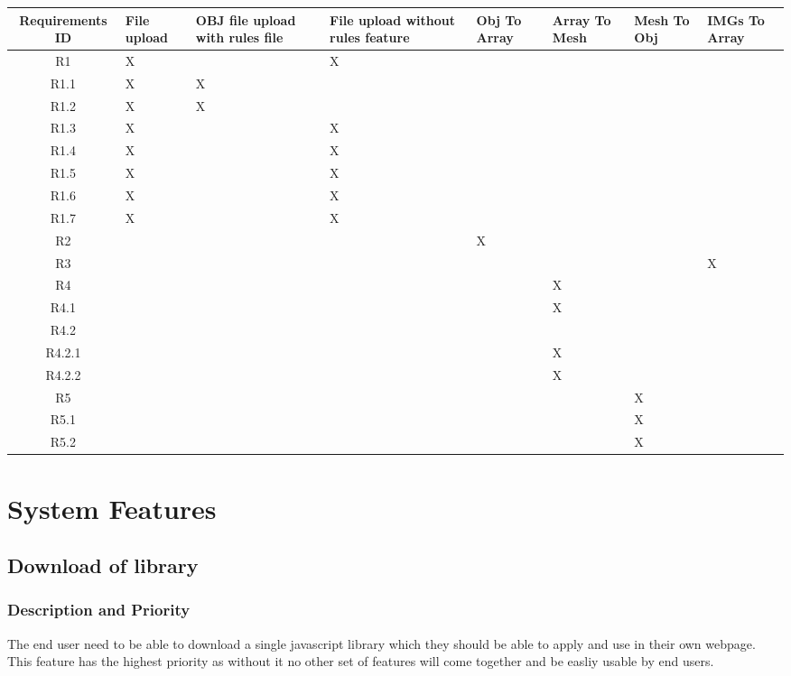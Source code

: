 \documentclass[english]{article}
\begin{document}
			\begin{tabular}[left]{| c |m{1.2cm} | m{1.4cm} | m{1.4cm} | m{1.0cm} | m{1.0cm} | m{1.0cm} | m{1.0cm}|} 
				\hline
				Requirements ID & File upload & OBJ file upload with rules file & File upload without rules feature & Obj To Array & Array To Mesh & Mesh To Obj & IMGs To Array \\ [0.5ex] 
				\hline\hline
				R1 & X &  & X &  &  &  &  \\ 
				\hline
				R1.1 & X & X &  &  &  &  &  \\
				\hline
				R1.2 & X & X &  &  &  &  &  \\
				\hline
				R1.3 & X &  & X &  &  &  &  \\
				\hline
				R1.4 & X &  & X &  &  &  &  \\
				\hline
				R1.5 & X &  & X &  &  &  &  \\
				\hline
				R1.6 & X &  & X &  &  &  &  \\
				\hline
				R1.7 & X &  & X &  &  &  &  \\
				\hline
				R2 &  &  &  & X &  &  &  \\
				\hline
				R3 &  &  &  &  &  &  & X \\
				\hline
				R4 &  &  &  &  & X &  &  \\
				\hline
				R4.1 &  &  &  &  & X &  &  \\
				\hline
				R4.2 &  &  &  &  &  &  &  \\
				\hline
				R4.2.1 &  &  &  &  & X &  &  \\
				\hline
				R4.2.2 &  &  &  &  & X &  &  \\
				\hline
				R5 &  &  &  &  &  & X &  \\
				\hline
				R5.1 &  &  &  &  &  & X &  \\
				\hline
				R5.2 &  &  &  &  &  & X &  \\
				\hline
			\end{tabular}
	
	\pagebreak
	\section{System Features}
		\subsection{Download of library}
		\subsubsection{Description and Priority}
		The end user need to be able to download a single javascript library which they should be able to apply and use in their own webpage. This feature has the highest priority as without it no other set of features will come together and be easliy usable by end users.
		
\end{document}

